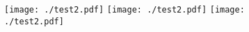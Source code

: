 \documentclass[ ]{article}
\begin{document}
\begin{figure}[thbp!]
    \centering
    \texttt{[image: ./test2.pdf]}
    \texttt{[image: ./test2.pdf]}
    \texttt{[image: ./test2.pdf]}
 \end{figure}
\end{document}
